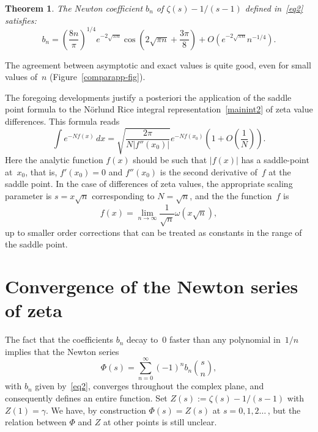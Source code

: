 \documentclass{amsart}
\newtheorem{theorem}{Theorem}
\begin{document}
\begin{theorem} \label{zetacoeff-thm}
The Newton coefficient $b_n$ of $\zeta(s)-1/(s-1)$ defined in~\eqref{eq2}
satisfies:
\begin{equation}\label{thmz}
b_n = \left( \frac{8n}{\pi}\right)^{1/4}
e^{-2\sqrt{\pi n}}\cos\left(2\sqrt{\pi n}+\frac{3\pi}{8}\right)
+O\left(e^{-2\sqrt{\pi n}}n^{-1/4}\right).
\end{equation}
\end{theorem}

The agreement between asymptotic and exact values is quite good,
even for small values of~$n$ (Figure~\ref{comparapp-fig}).

\smallskip

The foregoing developments justify a posteriori the application of the saddle point formula to the N\"orlund Rice
integral representation~\eqref{mainint2} of zeta value differences. This formula
reads
\begin{equation}\label{sadfor}
\int e^{-Nf(x)} \, dx =\sqrt{\frac{2\pi}{N|f''(x_0)|}}
e^{-N f(x_0)}\left(1+O\left(\frac{1}{N}\right)\right).
\end{equation}
Here the analytic function $f(x)$ should be such that $|f(x)|$ has a saddle-point at~$x_0$,
that is, $f'(x_0)=0$ and $f''(x_0)$ is the second derivative of~$f$ at the saddle point.
In the case of differences of zeta values, 
the appropriate scaling parameter is $s=x\sqrt{n}$ corresponding to $N=\sqrt{n}$, and the
the function~$f$ is
\[
f(x)=\lim_{n\to\infty} \frac{1}{\sqrt{n}}\omega\left(x\sqrt{n}\right),
\]
up to smaller order corrections that can be treated as constants in the range of the saddle point.

\section{Convergence of the Newton series of zeta}

The fact that the coefficients $b_n$ decay to~$0$ faster than any polynomial in~$1/n$ 
implies that the Newton series
\begin{equation}\label{newtonz}
\Phi(s)=\sum_{n=0}^\infty (-1)^n b_n \binom{s}{n},
\end{equation}
with $b_n$ given by~\eqref{eq2},
converges throughout the complex plane, and consequently defines an entire function.
Set $Z(s):=\zeta(s)-1/(s-1)$ with~$Z(1)=\gamma$. We have, by construction $\Phi(s)=Z(s)$
at $s=0,1,2\ldots\,$, but the relation between $\Phi$ and $Z$ at other points is still unclear.
\end{document}
